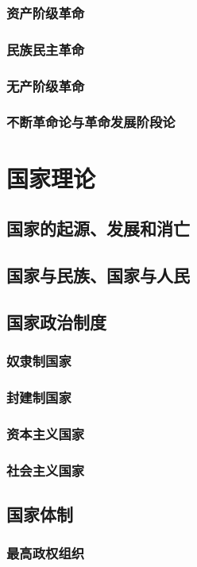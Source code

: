 \documentclass[UTF8]{../RepresentationUniverse}
\begin{document}
    \subsubsection{资产阶级革命}
    \subsubsection{民族民主革命}
    \subsubsection{无产阶级革命}
    \subsubsection{不断革命论与革命发展阶段论}


\section{国家理论}
\subsection{国家的起源、发展和消亡}
\subsection{国家与民族、国家与人民}
\subsection{国家政治制度}
    \subsubsection{奴隶制国家}
    \subsubsection{封建制国家}
    \subsubsection{资本主义国家}
    \subsubsection{社会主义国家}
\subsection{国家体制}
    \subsubsection{最高政权组织}
\end{document}
